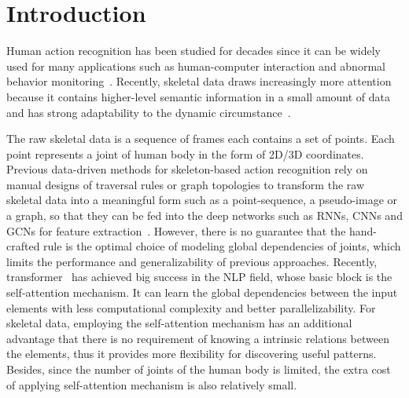 \documentclass[runningheads]{llncs}
\begin{document}
\section{Introduction}
\label{sec:introduction}
Human action recognition has been studied for decades since it can be widely used for many applications such as human-computer interaction and abnormal behavior monitoring~\cite{carreira_quo_2017,shi_gesture_2019,feichtenhofer_slowfast_2019,shi_action_2019}. 
Recently, skeletal data draws increasingly more attention because it contains higher-level semantic information in a small amount of data and has strong adaptability to the dynamic circumstance~\cite{yan_spatial_2018,shi_two-stream_2019,shi_skeleton-based_2019}. 

The raw skeletal data is a sequence of frames each contains a set of points.
Each point represents a joint of human body in the form of 2D/3D coordinates. 
Previous data-driven methods for skeleton-based action recognition rely on manual designs of traversal rules or graph topologies to transform the raw skeletal data into a meaningful form such as a point-sequence, a pseudo-image or a graph, so that they can be fed into the deep networks such as RNNs, CNNs and GCNs for feature extraction~\cite{yan_spatial_2018,qiu_learning_2017,zhang_view_2017}. 
However, there is no guarantee that the hand-crafted rule is the optimal choice of modeling global dependencies of joints, 
which limits the performance and generalizability of previous approaches. 
Recently, transformer~\cite{vaswani_attention_2017,dai_transformer-xl:_2019} has achieved big success in the NLP field, whose basic block is the self-attention mechanism. 
It can learn the global dependencies between the input elements  with less computational complexity and better parallelizability. 
For skeletal data, employing the self-attention mechanism has an additional advantage that there is no requirement of knowing a intrinsic relations between the elements, thus it provides more flexibility for discovering useful patterns. 
Besides, since the number of joints of the human body is limited, the extra cost of applying self-attention mechanism is also relatively small. 
\end{document}
